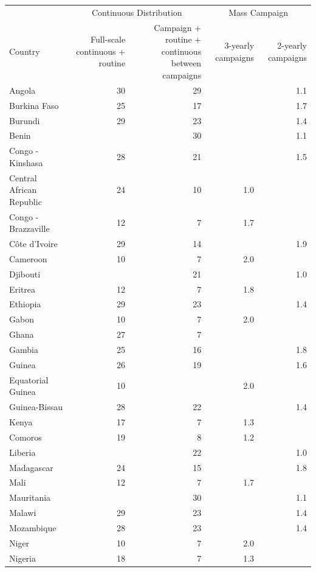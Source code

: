 \documentclass[review,
3p]{elsarticle} %
\begin{document}
\begin{tabular}[t]{l|r|r|r|r}
\hline
\multicolumn{1}{c|}{ } & \multicolumn{2}{c|}{Continuous Distribution} & \multicolumn{2}{c}{Mass Campaign} \\
\cline{2-3} \cline{4-5}
Country & Full-scale continuous + routine & Campaign + routine + continuous between campaigns & 3-yearly campaigns & 2-yearly campaigns\\
\hline
Angola & 30 & 29 &  & 1.1\\
\hline
Burkina Faso & 25 & 17 &  & 1.7\\
\hline
Burundi & 29 & 23 &  & 1.4\\
\hline
Benin &  & 30 &  & 1.1\\
\hline
Congo - Kinshasa & 28 & 21 &  & 1.5\\
\hline
Central African Republic & 24 & 10 & 1.0 & \\
\hline
Congo - Brazzaville & 12 & 7 & 1.7 & \\
\hline
Côte d’Ivoire & 29 & 14 &  & 1.9\\
\hline
Cameroon & 10 & 7 & 2.0 & \\
\hline
Djibouti &  & 21 &  & 1.0\\
\hline
Eritrea & 12 & 7 & 1.8 & \\
\hline
Ethiopia & 29 & 23 &  & 1.4\\
\hline
Gabon & 10 & 7 & 2.0 & \\
\hline
Ghana & 27 & 7 &  & \\
\hline
Gambia & 25 & 16 &  & 1.8\\
\hline
Guinea & 26 & 19 &  & 1.6\\
\hline
Equatorial Guinea & 10 &  & 2.0 & \\
\hline
Guinea-Bissau & 28 & 22 &  & 1.4\\
\hline
Kenya & 17 & 7 & 1.3 & \\
\hline
Comoros & 19 & 8 & 1.2 & \\
\hline
Liberia &  & 22 &  & 1.0\\
\hline
Madagascar & 24 & 15 &  & 1.8\\
\hline
Mali & 12 & 7 & 1.7 & \\
\hline
Mauritania &  & 30 &  & 1.1\\
\hline
Malawi & 29 & 23 &  & 1.4\\
\hline
Mozambique & 28 & 23 &  & 1.4\\
\hline
Niger & 10 & 7 & 2.0 & \\
\hline
Nigeria & 18 & 7 & 1.3 & \\
\hline

\end{tabular}
\end{document}
